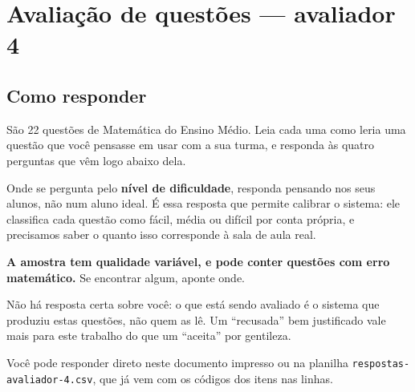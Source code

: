 \documentclass[11pt,a4paper]{article}
\begin{document}
\section*{Avaliação de questões --- avaliador 4}
\subsection*{Como responder}

São 22 questões de Matemática do Ensino Médio. Leia cada uma como leria uma
questão que você pensasse em usar com a sua turma, e responda às quatro
perguntas que vêm logo abaixo dela.

Onde se pergunta pelo \textbf{nível de dificuldade}, responda pensando nos
seus alunos, não num aluno ideal. É essa resposta que permite calibrar o
sistema: ele classifica cada questão como fácil, média ou difícil por conta
própria, e precisamos saber o quanto isso corresponde à sala de aula real.

\textbf{A amostra tem qualidade variável, e pode conter questões com erro
matemático.} Se encontrar algum, aponte onde.

Não há resposta certa sobre você: o que está sendo avaliado é o sistema que
produziu estas questões, não quem as lê. Um ``recusada'' bem justificado vale
mais para este trabalho do que um ``aceita'' por gentileza.

Você pode responder direto neste documento impresso ou na planilha
\texttt{respostas-avaliador-4.csv}, que já vem com os códigos dos itens nas linhas.
\end{document}
